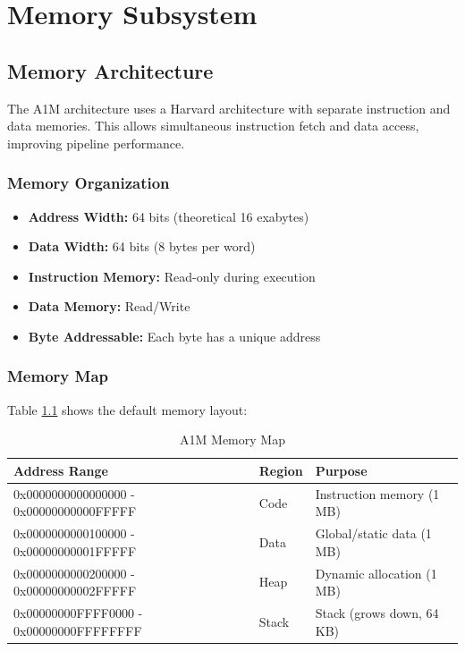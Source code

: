 \documentclass[12pt,a4paper,oneside]{book}
\begin{document}
\chapter{Memory Subsystem}

\section{Memory Architecture}

The A1M architecture uses a Harvard architecture with separate instruction and data memories. This allows simultaneous instruction fetch and data access, improving pipeline performance.

\subsection{Memory Organization}

\begin{itemize}
    \item \textbf{Address Width:} 64 bits (theoretical 16 exabytes)
    \item \textbf{Data Width:} 64 bits (8 bytes per word)
    \item \textbf{Instruction Memory:} Read-only during execution
    \item \textbf{Data Memory:} Read/Write
    \item \textbf{Byte Addressable:} Each byte has a unique address
\end{itemize}

\subsection{Memory Map}

Table \ref{tab:memory-map} shows the default memory layout:

\begin{table}[H]
\centering
\caption{A1M Memory Map}
\label{tab:memory-map}
\begin{tabularx}{\textwidth}{|l|l|X|}
\hline
\textbf{Address Range} & \textbf{Region} & \textbf{Purpose} \\
\hline
0x0000000000000000 - 0x00000000000FFFFF & Code & Instruction memory (1 MB) \\
0x0000000000100000 - 0x00000000001FFFFF & Data & Global/static data (1 MB) \\
0x0000000000200000 - 0x00000000002FFFFF & Heap & Dynamic allocation (1 MB) \\
0x00000000FFFF0000 - 0x00000000FFFFFFFF & Stack & Stack (grows down, 64 KB) \\
\hline
\end{tabularx}
\end{table}
\end{document}
